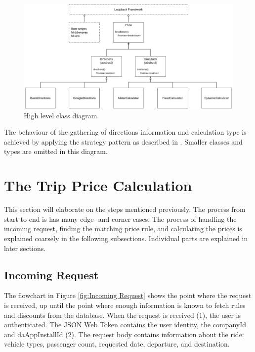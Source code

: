 \begin{figure}[H]
	\centering
	\includegraphics[width=1\textwidth]{ClassDiagram}
	\caption[Class Diagram]{High level class diagram.}
	\label{fig:Class Diagram}
\end{figure}

The behaviour of the gathering of directions information and calculation type is achieved by applying the strategy pattern as described in \cite{gof}. Smaller classes and types are omitted in this diagram.

\section{The Trip Price Calculation}
This section will elaborate on the steps mentioned previously. The process from start to end is has many edge- and corner cases. The process of handling the incoming request, finding the matching price rule, and calculating the prices is explained coarsely in the following subsections. Individual parts are explained in later sections.

\subsection{Incoming Request}
The flowchart in Figure \ref{fig:Incoming Request} shows the point where the request is received, up until the point where enough information is known to fetch rules and discounts from the database. When the request is received (1), the user is authenticated. The JSON Web Token contains the user identity, the companyId and daAppInstallId (2). The request body contains information about the ride: vehicle types, passenger count, requested date, departure, and destination.

